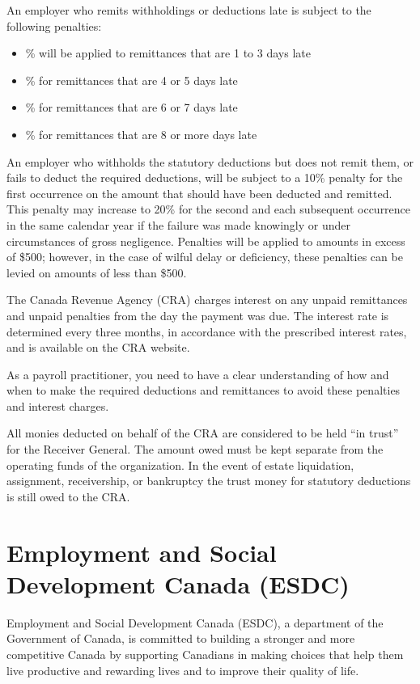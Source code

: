 \documentclass[letterpaper,10pt,english]{sphinxmanual}
\begin{document}
\sphinxAtStartPar
An employer who remits withholdings or deductions late is subject to the following penalties:
\begin{itemize}
\item {} 
\% will be applied to remittances that are 1 to 3 days late

\item {} 
\% for remittances that are 4 or 5 days late

\item {} 
\% for remittances that are 6 or 7 days late

\item {} 
\% for remittances that are 8 or more days late

\end{itemize}

\sphinxAtStartPar
An employer who withholds the statutory deductions but does not remit them, or fails to
deduct the required deductions, will be subject to a 10\% penalty for the first occurrence on
the amount that should have been deducted and remitted. This penalty may increase to 20\%
for the second and each subsequent occurrence in the same calendar year if the failure was
made knowingly or under circumstances of gross negligence. Penalties will be applied to
amounts in excess of \$500; however, in the case of wilful delay or deficiency, these penalties
can be levied on amounts of less than \$500.

\sphinxAtStartPar
The Canada Revenue Agency (CRA) charges interest on any unpaid remittances and unpaid
penalties from the day the payment was due. The interest rate is determined every three
months, in accordance with the prescribed interest rates, and is available on the CRA
website.

\sphinxAtStartPar
As a payroll practitioner, you need to have a clear understanding of how and when to make
the required deductions and remittances to avoid these penalties and interest charges.

\sphinxAtStartPar
All monies deducted on behalf of the CRA are considered to be held “in trust” for the
Receiver General. The amount owed must be kept separate from the operating funds of the
organization. In the event of estate liquidation, assignment, receivership, or bankruptcy the
trust money for statutory deductions is still owed to the CRA.


\section{Employment and Social Development Canada (ESDC)}
\label{\detokenize{2_compliance:employment-and-social-development-canada-esdc}}
\sphinxAtStartPar
Employment and Social Development Canada (ESDC), a department of the Government of
Canada, is committed to building a stronger and more competitive Canada by supporting
Canadians in making choices that help them live productive and rewarding lives and to
improve their quality of life.
\end{document}
